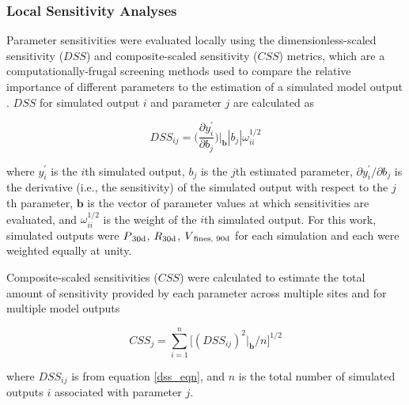 \subsubsection{Local Sensitivity Analyses} \label{sssec:MM_local_sensitivity}
Parameter sensitivities were evaluated locally using the dimensionless-scaled sensitivity ($DSS$) and composite-scaled sensitivity ($CSS$) metrics, which are a computationally-frugal screening methods used to compare the relative importance of different parameters to the estimation of a simulated model output \citep{hill2007effective}. $DSS$ for simulated output $i$ and parameter $j$ are calculated as 

\begin{equation}
    DSS_{ij} = \bigg(\frac{\partial y_i^'}{\partial b_j}\bigg)\bigg\rvert_\textbf{b}\left|b_j\right|\omega_{ii}^{1/2}
    \label{dss_eqn}
\end{equation}

\noindent where $y_i^'$ is the $i$th simulated output, $b_j$ is the $j$th estimated parameter, $\partial {y_i^'}/\partial b_j$ is the derivative (i.e., the sensitivity) of the simulated output with respect to the $j$th parameter, $\textbf{b}$ is the vector of parameter values at which sensitivities are evaluated, and $\omega_{ii}^{1/2}$ is the weight of the $i$th simulated output. For this work, simulated outputs were $P\textsubscript{30d}$, $R\textsubscript{30d}$, $V\textsubscript{fines, 90d}$ for each simulation and each were weighted equally at unity.

Composite-scaled sensitivities ($CSS$) were calculated to estimate the total amount of sensitivity provided by each parameter across multiple sites and for multiple model outputs

\begin{equation}
    CSS_{j} = \displaystyle\sum_{i=1}^{n}\bigg[{(DSS_{ij})^2}\big\rvert_\textbf{b}/{n}\bigg]^{1/2}
    \label{css_eqn}
\end{equation}

\noindent where $DSS_{ij}$ is from equation \ref{dss_eqn}, and $n$ is the total number of simulated outputs $i$ associated with parameter $j$. 

